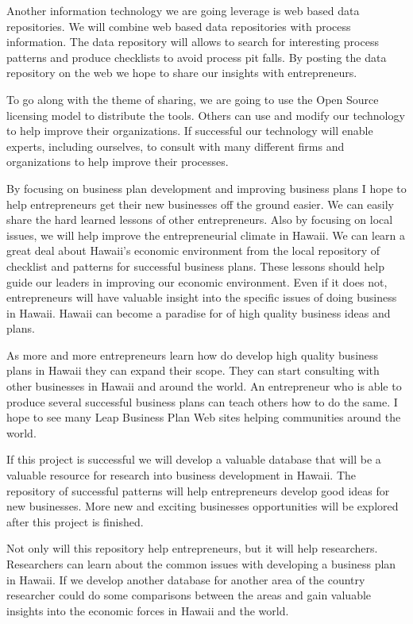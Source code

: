 Another information technology we are going leverage is web based data
repositories.  We will combine web based data repositories with process
information.  The data repository will allows to search for interesting
process patterns and produce checklists to avoid process pit falls.  By
posting the data repository on the web we hope to share our insights with
entrepreneurs. 

To go along with the theme of sharing, we are going to use the Open Source
licensing model to distribute the tools.  Others can use and modify our
technology to help improve their organizations.  If successful our
technology will enable experts, including ourselves, to consult with many
different firms and organizations to help improve their processes.  

By focusing on business plan development and improving business plans I
hope to help entrepreneurs get their new businesses off the ground easier.
We can easily share the hard learned lessons of other entrepreneurs.  Also
by focusing on local issues, we will help improve the entrepreneurial
climate in Hawaii.  We can learn a great deal about Hawaii's economic
environment from the local repository of checklist and patterns for
successful business plans.  These lessons should help guide our leaders in
improving our economic environment.  Even if it does not, entrepreneurs
will have valuable insight into the specific issues of doing business in
Hawaii.  Hawaii can become a paradise for of high quality business ideas
and plans.

As more and more entrepreneurs learn how do develop high quality business
plans in Hawaii they can expand their scope.  They can start consulting
with other businesses in Hawaii and around the world.  An entrepreneur who
is able to produce several successful business plans can teach others how
to do the same.  I hope to see many Leap Business Plan Web sites helping
communities around the world.

If this project is successful we will develop a valuable database that will
be a valuable resource for research into business development in Hawaii.
The repository of successful patterns will help entrepreneurs develop good
ideas for new businesses.  More new and exciting businesses opportunities
will be explored after this project is finished.

Not only will this repository help entrepreneurs, but it will help
researchers.  Researchers can learn about the common issues with developing
a business plan in Hawaii.  If we develop another database for another area
of the country researcher could do some comparisons between the areas and
gain valuable insights into the economic forces in Hawaii and the world.


